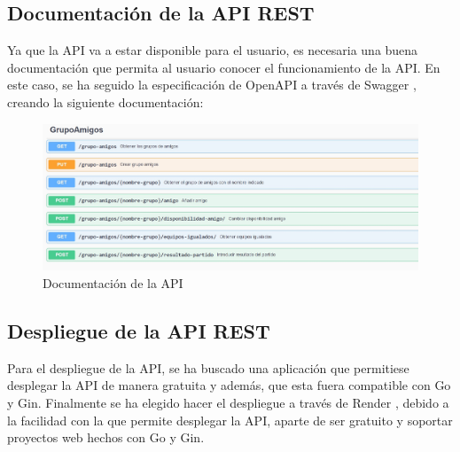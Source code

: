 \subsection{Documentación de la API REST}
Ya que la API va a estar disponible para el usuario, es necesaria una buena documentación que permita al usuario conocer el funcionamiento de la API.
En este caso, se ha seguido la especificación de OpenAPI a través de Swagger \cite{swagger}, creando la siguiente documentación:

\begin{figure}[H]
	\centering	
	\includegraphics[scale=0.25]{img/doc-api.jpg}
	\caption{Documentación de la API}
\end{figure}

\subsection{Despliegue de la API REST}
Para el despliegue de la API, se ha buscado una aplicación que permitiese desplegar la API de manera gratuita y además, que esta fuera compatible con Go y Gin.
Finalmente se ha elegido hacer el despliegue a través de Render \cite{render}, debido a la facilidad con la que permite desplegar la API, aparte de ser gratuito y soportar proyectos web hechos con Go y Gin.